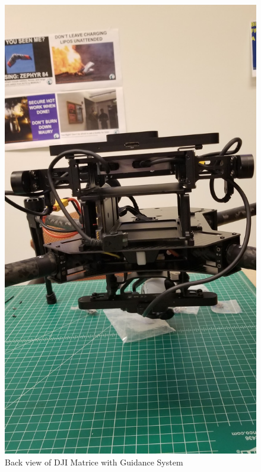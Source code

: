 \begin{figure}
\begin{center}
\includegraphics[width=0.8\columnwidth]{figures/hovering3.png}
\end{center}
\caption{Back view of DJI Matrice with Guidance System}
\label{fig:hovering3}
\end{figure}

